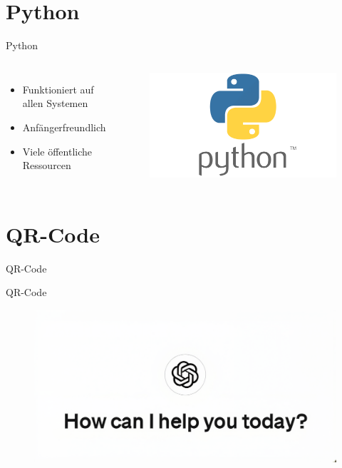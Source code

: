 \documentclass[a4paper,
	DIV=13,
	14pt,
	BCOR=10mm,
	department=FakEI,
	twoside,
	parskip=half,
	automark,
	aspectratio=169
]{beamer}
\begin{document}
\section{Python}
\begin{frame}{Python}
	\begin{columns}
		\begin{itemize}
			\item Funktioniert auf allen Systemen
			\item Anfängerfreundlich
			\item Viele öffentliche Ressourcen
		\end{itemize}
		\begin{figure}[H]
			\includegraphics[width=\linewidth]{img/python.png}
		\end{figure}
	\end{columns}
\end{frame}

\section{QR-Code}
\begin{frame}{QR-Code}
\end{frame}

\begin{frame}{QR-Code}
	\begin{figure}[H]
		\includegraphics[width=0.8\linewidth]{img/ChatGPT.png}
	\end{figure}
\end{frame}
\end{document}

